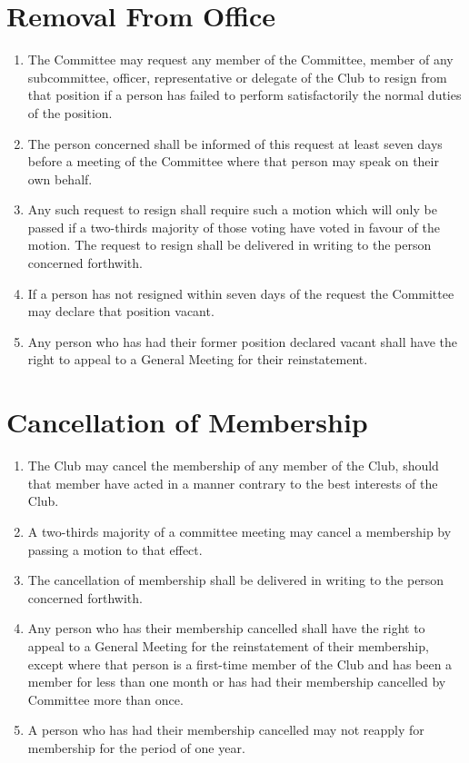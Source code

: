 \documentclass[11pt]{article} %
\begin{document}
\section{Removal From Office}
\begin{enumerate}
	\item The Committee may request any member of the Committee, member of any subcommittee, officer, representative or delegate of the Club to resign from that position if a person has failed to perform satisfactorily the normal duties of the position.
	\item The person concerned shall be informed of this request at least seven days before a meeting of the Committee where that person may speak on their own behalf.
	\item Any such request to resign shall require such a motion which will only be passed if a two-thirds majority of those voting have voted in favour of the motion. The request to resign shall be delivered in writing to the person concerned forthwith.
	\item If a person has not resigned within seven days of the request the Committee may declare that position vacant.
	\item Any person who has had their former position declared vacant shall have the right to appeal to a General Meeting for their reinstatement.
\end{enumerate}

\section{Cancellation of Membership}
\begin{enumerate}
\item The Club may cancel the membership of any member of the Club, should that member have acted in a manner contrary to the best interests of the Club.
\item A two-thirds majority of a committee meeting may cancel a membership by passing a motion to that effect.
\item The cancellation of membership shall be delivered in writing to the person concerned forthwith.
\item Any person who has their membership cancelled shall have the right to appeal to a General Meeting for the reinstatement of their membership, except where that person is a first-time member of the Club and has been a member for less than one month or has had their membership cancelled by Committee more than once.
\item A person who has had their membership cancelled may not reapply for membership for the period of one year.
\end{enumerate}
\end{document}
